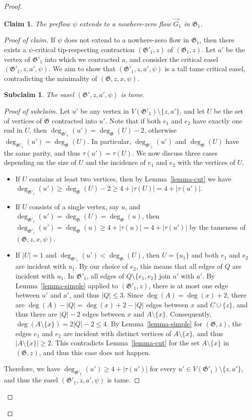 \documentclass{article}
\newcommand\g{\mathfrak{G}}
\newtheorem*{claim*}{Claim}
\newtheorem*{subclaim*}{Subclaim}
\newenvironment{subproof}{%
  \renewcommand{\qedsymbol}{$\blacksquare$}%
  \begin{proof}[Proof of claim]%
}{%
  \end{proof}%
}
\newenvironment{subsubproof}{%
  \renewcommand{\qedsymbol}{$\blacksquare$}%
  \begin{proof}[Proof of subclaim]%
}{%
  \end{proof}%
}
\begin{document}
\begin{proof}
\begin{claim*}
\label{claim:preflowextension}
The preflow $\psi$ extends to a nowhere-zero flow $\vec{G}_{1}$ in $\g_1$.
\end{claim*}

\begin{subproof}
If $\psi$ does not extend to a nowhere-zero flow in $\g_1$, then there exists a $\psi$-critical tip-respecting contraction $(\g'_1,z)$ of $(\g_1,z)$.
Let $a'$ be the vertex of $\g'_1$ into which we contracted $a$, and consider
the critical easel $(\g'_1,z,a',\psi)$. We aim to show that
$(\g'_{1},z,a',\psi)$ is a tall tame critical easel, contradicting the minimality of
$(\g,z,x,\psi)$.

\begin{subclaim*}
   The easel $(\g',z,a',\psi)$ is tame.
\end{subclaim*}

\begin{subsubproof}
 Let $u'$ be any vertex in $V(\g'_1)\setminus \{z,a'\}$, and let $U$ be the set of vertices of $\g$ contracted into $u'$. 
    Note that if both $e_1$ and $e_2$ have exactly one end in $U$, then $\deg_{\g'_1}(u')=\deg_{\g}(U)-2$, otherwise $\deg_{\g'_1}(u')=\deg_{\g}(U)$.
    In particular, $\deg_{\g'_1}(u')$ and $\deg_{\g}(U)$ have the same parity, and thus $\tau(u')=\tau(U)$.
    We now discuss three cases depending on the size of $U$ and the incidence of $e_1$ and $e_2$ with the vertices of $U$.
\begin{itemize} 
\item If $U$ contains at least two vertices, then by Lemma~\ref{lemma-cut} we have $\deg_{\g'_1}(u')\ge \deg_{\g}(U)-2\ge 4+|\tau(U)|=4+|\tau(u')|$.
\item If $U$ consists of a single vertex, say $u$, and  $\deg_{\g'_1}(u')=\deg_{\g}(U)=\deg_{\g}(u)$, then $\deg_{\g'_1}(u')=\deg_{\g}(u)\ge 4+|\tau(u)|=4+|\tau(u')|$
by the tameness of $(\g,z,x,\psi)$. 
\item If $|U|=1$ and $\deg_{\g'_1}(u')<\deg_{\g}(U)$, then $U=\{u_1\}$ and both $e_1$ and $e_2$ are incident with $u_{1}$.  By our choice of $e_2$, this means that all edges of $Q$ are incident with $u_{1}$. In $\g'_1$, all edges of $Q\setminus\{e_1,e_2\}$ join $u'$ with $a'$.  By Lemma~\ref{lemma-simple}
applied to $(\g'_1,z)$, there is at most one edge between $u'$ and $a'$, and thus $|Q|\le 3$.  Since $\deg(A)=\deg(x)+2$,
there are $\deg(A)-|Q|=\deg(x)+2-|Q|$ edges between $x$ and $C\cup\{z\}$, and thus there are $|Q|-2$ edges between $x$ and $A\setminus\{x\}$.
Consequently, $\deg(A\setminus\{x\})=2|Q|-2\le 4$.  By Lemma~\ref{lemma-simple} for $(\g,z)$, the edges $e_1$ and $e_2$ are incident with
distinct vertices of $A\setminus\{x\}$, and thus $|A\setminus \{x\}|\ge 2$.  This contradicts Lemma~\ref{lemma-cut} for the set $A\setminus\{x\}$ in $(\g,z)$, and thus this case does not happen.
\end{itemize}
Therefore, we have $\deg_{\g'_1}(u')\ge 4+|\tau(u')|$ for every $u'\in V(\g'_1)\setminus\{z,a'\}$, and thus the easel $(\g'_1,z,a',\psi)$
is tame. 
\end{subsubproof}


\end{subproof}
\end{proof}
\end{document}
